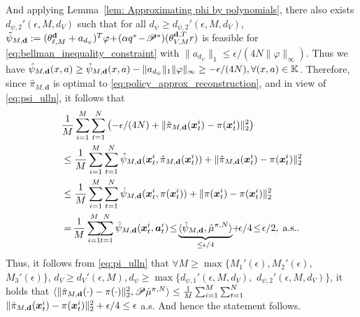 \begin{pf}
    And applying Lemma~\ref{lem: Approximating phi by polynomials}, there also exists $d_{\psi,2}'(\epsilon, M, d_V)$ such that for all $d_\psi \geq d_{\psi,2}'(\epsilon, M, d_V)$, $\tilde{\psi}_{M,\mathbf{d}}:=(\theta_{\ell, M}^{\mathbf{d}}+a_{d_\psi})^T\varphi\!+\!(\alpha q^*\!-\!\mathscr{P}^*)(\theta_{V, M}^{\mathbf{d},T}r)$ is feasible for \eqref{eq:bellman_inequality_constraint} with $\|a_{d_\psi}\|_1\leq \epsilon/( 4N\| \varphi \|_\infty)$.
    Thus we have $ \hat\psi_{M,\mathbf{d}} (x,a)\geq \tilde{\psi}_{M,\mathbf{d}}(x,a) - \|a_{d_\psi}\|_1\| \varphi \|_\infty \geq -\epsilon/(4N), \forall (x,a)\in\mathbb{K}$. 
    Therefore, since $\hat\pi_{M,\mathbf{d}}$ is optimal to \eqref{eq:policy_approx_reconstruction}, and in view of \eqref{eq:psi_ulln}, it follows that
    \begin{align*}
        &\frac{1}{M}\sum_{i=1}^M\sum_{t=1}^N \left(-\epsilon/(4N) + \|\hat\pi_{M,\mathbf{d}}(\mfx_{t}^i)-\pitrue(\mfx_{t}^i)\|_2^2\right)  \\
        &\leq \frac{1}{M}\sum_{i=1}^M\sum_{t=1}^N \hat\psi_{M,\mathbf{d}}(\mfx_{t}^i, \hat\pi_{M,\mathbf{d}}(\mfx_{t}^i)) + \|\hat\pi_{M,\mathbf{d}}(\mfx_{t}^i)-\pitrue(\mfx_{t}^i)\|_2^2\\
        &\leq \frac{1}{M}\sum_{i=1}^M\sum_{t=1}^N \hat\psi_{M,\mathbf{d}}(\mfx_{t}^i, \pitrue(\mfx_{t}^i)) + \|\pitrue(\mfx_{t}^i)-\pitrue(\mfx_{t}^i)\|_2^2 \\
        &=\! \frac{1}{M}\sum_{i=1}^M\!\!\sum_{t=1}^N\hat\psi_{M,\mathbf{d}}(\mfx_{t}^i, \mfa_{t}^i)\!\leq\! \underbrace{\langle \hat\psi_{M,\mathbf{d}}, \hat{\mu}^{\pitrue,N} \rangle}_{\le \epsilon/4}\! +\! \epsilon/4 \!\leq\!  \epsilon/2,\;\mbox{a.s.}.
    \end{align*}
    Thus, it follows from \eqref{eq:pi_ulln} that $\forall M\!\ge\!\max\{M_1'(\epsilon),\!M_2'(\epsilon),\!$ $M_3'(\epsilon)\}$, $d_V\geq d_V'(\epsilon, M), d_\psi \geq \max\{d_{\psi,1}'(\epsilon, M, d_V),$ $d_{\psi,2}'(\epsilon, M, d_V)\}$, 
    it holds that $\langle \|\hat\pi_{M,\mathbf{d}}(\cdot)-\relax{\pi}(\cdot)\|_2^2, \mathscr{P}\hat\mu^{\relax{\pi},N} \rangle \leq \frac{1}{M}\sum_{i=1}^M\sum_{t=1}^N $ 
    $\|\hat\pi_{M,\mathbf{d}}(\bm{x}_{t}^i)-\relax{\pi}(\bm{x}_{t}^i)\|_2^2 + \epsilon/4 \leq \epsilon$ a.s.
    And hence the statement follows.

    
    
    
    
    
    
    
    
    
    


    

\end{pf}


